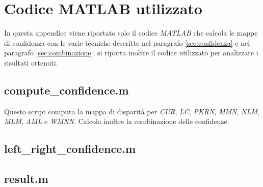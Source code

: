 \documentclass[12pt]{report}
\begin{document}
	\appendix 
	\renewcommand\chaptername{Appendice}
	
	\chapter{Codice MATLAB utilizzato}
	\label{sec:codice}
	
		In questa appendice viene riportato solo il codice \textit{MATLAB} che calcola le mappe di confidenza con le varie tecniche descritte nel paragrafo \ref{sec:confidenza} e nel paragrafo \ref{sec:combinazione}; si riporta inoltre il codice utilizzato per analizzare i risultati ottenuti.
	
		\section{compute\_confidence.m}
		\label{sec:computeConfidence}
		
			Questo script computa la mappa di disparità per \textit{CUR}, \textit{LC}, \textit{PKRN}, \textit{MMN}, \textit{NLM}, \textit{MLM}, \textit{AML} e \textit{WMNN}. Calcola inoltre la combinazione delle confidenze.
	
			
		
		\section{left\_right\_confidence.m}
		\label{sec:leftright}
			
		
		\section{result.m}
		\label{sec:result}
				
			
			
\end{document}
